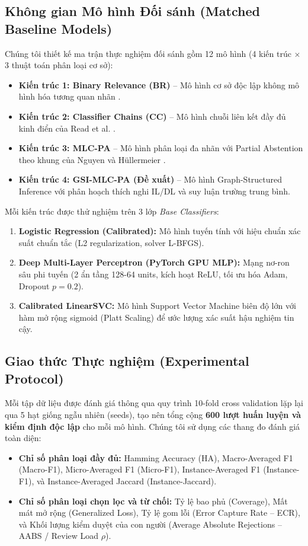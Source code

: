 \documentclass[11pt,a4paper]{article}
\begin{document}
\subsection{Không gian Mô hình Đối sánh (Matched Baseline Models)}
Chúng tôi thiết kế ma trận thực nghiệm đối sánh gồm 12 mô hình (4 kiến trúc $\times$ 3 thuật toán phân loại cơ sở):
\begin{itemize}
    \item \textbf{Kiến trúc 1: Binary Relevance (BR)} -- Mô hình cơ sở độc lập không mô hình hóa tương quan nhãn \cite{luaces2012binary}.
    \item \textbf{Kiến trúc 2: Classifier Chains (CC)} -- Mô hình chuỗi liên kết đầy đủ kinh điển của Read et al. \cite{read2011classifier}.
    \item \textbf{Kiến trúc 3: MLC-PA} -- Mô hình phân loại đa nhãn với Partial Abstention theo khung của Nguyen và H\"ullermeier \cite{nguyen2021multilabel}.
    \item \textbf{Kiến trúc 4: GSI-MLC-PA (Đề xuất)} -- Mô hình Graph-Structured Inference với phân hoạch thích nghi IL/DL và suy luận trường trung bình.
\end{itemize}
Mỗi kiến trúc được thử nghiệm trên 3 lớp \textit{Base Classifiers}:
\begin{enumerate}
    \item \textbf{Logistic Regression (Calibrated):} Mô hình tuyến tính với hiệu chuẩn xác suất chuẩn tắc (L2 regularization, solver L-BFGS).
    \item \textbf{Deep Multi-Layer Perceptron (PyTorch GPU MLP):} Mạng nơ-ron sâu phi tuyến (2 ẩn tầng 128-64 units, kích hoạt ReLU, tối ưu hóa Adam, Dropout $p=0.2$).
    \item \textbf{Calibrated LinearSVC:} Mô hình Support Vector Machine biên độ lớn với hàm mở rộng sigmoid (Platt Scaling) để ước lượng xác suất hậu nghiệm tin cậy.
\end{enumerate}

\subsection{Giao thức Thực nghiệm (Experimental Protocol)}
Mỗi tập dữ liệu được đánh giá thông qua quy trình 10-fold cross validation lặp lại qua 5 hạt giống ngẫu nhiên (seeds), tạo nên tổng cộng \textbf{600 lượt huấn luyện và kiểm định độc lập} cho mỗi mô hình. Chúng tôi sử dụng các thang đo đánh giá toàn diện:
\begin{itemize}
    \item \textbf{Chỉ số phân loại đầy đủ:} Hamming Accuracy (HA), Macro-Averaged F1 (Macro-F1), Micro-Averaged F1 (Micro-F1), Instance-Averaged F1 (Instance-F1), và Instance-Averaged Jaccard (Instance-Jaccard).
    \item \textbf{Chỉ số phân loại chọn lọc và từ chối:} Tỷ lệ bao phủ (Coverage), Mất mát mở rộng (Generalized Loss), Tỷ lệ gom lỗi (Error Capture Rate -- ECR), và Khối lượng kiểm duyệt của con người (Average Absolute Rejections -- AABS / Review Load $\rho$).
\end{itemize}
\end{document}
